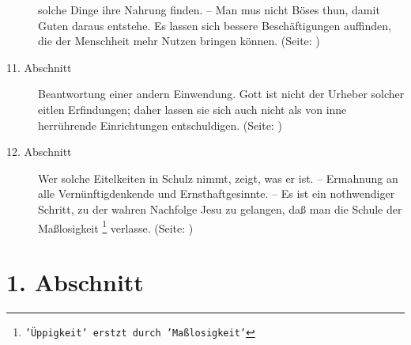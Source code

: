 \begin{description}
solche Dinge ihre Nahrung finden. -- Man mus nicht Böses thun, damit Guten
daraus entstehe. Es lassen sich bessere Beschäftigungen auffinden, die der
Menschheit mehr Nutzen bringen können. (Seite: \pageref{kap17_ab10})
\item[11. Abschnitt] Beantwortung einer andern Einwendung. Gott ist nicht der
Urheber solcher eitlen Erfindungen; daher lassen sie sich auch nicht als von
inne herrührende Einrichtungen entschuldigen. (Seite: \pageref{kap17_ab11})
\item[12. Abschnitt] Wer solche Eitelkeiten in Schulz nimmt, zeigt, was er ist.
-- Ermahnung an alle Vernünftigdenkende und Ernsthaftgesinnte. -- Es ist ein
nothwendiger Schritt, zu der wahren Nachfolge Jesu zu gelangen, daß man die
Schule der Maßlosigkeit
\footnote{\texttt{'Üppigkeit' erstzt durch 'Maßlosigkeit'}}
verlasse. (Seite: \pageref{kap17_ab12})

\end{description}
\normalsize

\section{1. Abschnitt} \label{kap17_ab1}

